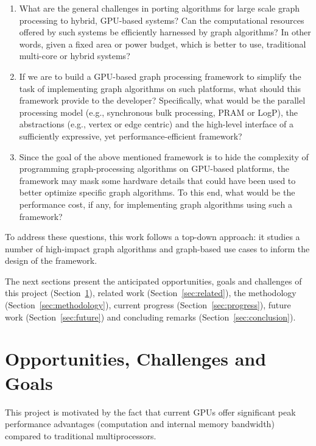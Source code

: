 \documentclass{acm_proc_article-sp}[12pt]
\begin{document}
\begin{enumerate}
  \item What are the general challenges in porting algorithms for large scale graph processing to hybrid, GPU-based systems? Can the computational resources offered by such systems be efficiently harnessed by graph algorithms? In other words, given a fixed area or power budget, which is better to use, traditional multi-core or hybrid systems?

  \item If we are to build a GPU-based graph processing framework to simplify the task of implementing graph algorithms on such platforms, what should this framework provide to the developer? Specifically, what would be the parallel processing model (e.g., synchronous bulk processing, PRAM or LogP), the abstractions (e.g., vertex or edge centric) and the high-level interface of a sufficiently expressive, yet performance-efficient framework? 
  
  \item Since the goal of the above mentioned framework is to hide the complexity of programming graph-processing algorithms on GPU-based platforms, the framework may mask some hardware details that could have been used to better optimize specific graph algorithms. To this end, what would be the performance cost, if any, for implementing graph algorithms using such a framework? 
\end{enumerate}

To address these questions, this work follows a top-down approach: it studies a number of high-impact graph algorithms and graph-based use cases to inform the design of the framework.

The next sections present the anticipated opportunities, goals and challenges of this project (Section~\ref{sec:opp}), related work (Section~\ref{sec:related}), the methodology (Section~\ref{sec:methodology}), current progress (Section~\ref{sec:progress}), future work (Section~\ref{sec:future}) and concluding remarks (Section~\ref{sec:conclusion}).

\section{Opportunities, Challenges and Goals}
\label{sec:opp}
This project is motivated by the fact that current GPUs offer significant peak performance advantages (computation and internal memory bandwidth) compared to traditional multiprocessors. 
\end{document}
